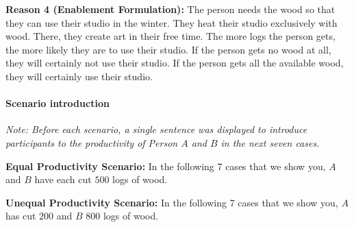 \documentclass[10pt,letterpaper]{article}
\begin{document}
\noindent\textbf{Reason 4 (Enablement Formulation):} The person needs the wood so that they can use their studio in the winter.
They heat their studio exclusively with wood.
There, they create art in their free time.
The more logs the person gets, the more likely they are to use their studio.
If the person gets no wood at all, they will certainly not use their studio.
If the person gets all the available wood, they will certainly use their studio.


\paragraph*{Scenario introduction}
\noindent\textit{Note: Before each scenario, a single sentence was displayed to introduce participants to the productivity of Person $A$ and $B$ in the next seven cases.}\vspace{2ex}

\noindent\textbf{Equal Productivity Scenario:} In the following 7 cases that we show you, $A$ and $B$ have each cut $500$ logs of wood.\vspace{2ex}

\noindent\textbf{Unequal Productivity Scenario:} In the following 7 cases that we show you, $A$ has cut $200$ and $B$ $800$ logs of wood.
\end{document}
